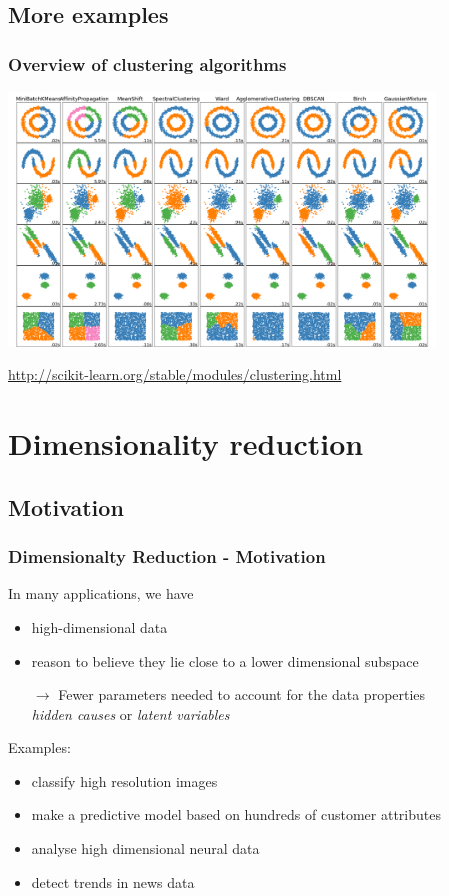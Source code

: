 \documentclass[Nike]{tuberlinbeamer}
\begin{document}
\subsection{More examples}
\begin{frame}
  \frametitle{Overview of clustering algorithms}
  \begin{center}
    \includegraphics[width=0.85\textwidth]{sklearn_doc_examples.png}
  \end{center}
  \tiny \url{http://scikit-learn.org/stable/modules/clustering.html} \cite{pedregosa2011scikit}
\end{frame}


\section{Dimensionality reduction}
\subsection{Motivation}
\begin{frame}\frametitle{Dimensionalty Reduction - Motivation}
In many applications, we have
\begin{itemize}
\item high-dimensional data
\item reason to believe they lie close to a lower dimensional subspace
\item[$\rightarrow$] Fewer parameters needed to account for the data properties \\
{\em hidden causes} or {\em latent variables}
\end{itemize}
\vspace{1em} \pause
Examples:
\begin{itemize}
\item classify high resolution images
\item make a predictive model based on hundreds of customer attributes
\item analyse high dimensional neural data
\item detect trends in news data
\end{itemize}
\end{frame}
\end{document}
